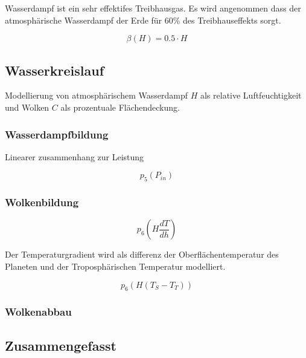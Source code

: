 \begin{refsection}
Wasserdampf ist ein sehr effektifes Treibhausgas. Es wird angenommen dass der atmosphärische Wasserdampf der Erde für 60\% des Treibhauseffekts sorgt.  




\begin{equation}
\beta(H) = 0.5 \cdot H
\end{equation}


\subsection{Wasserkreislauf}

Modellierung von atmosphärischem Wasserdampf $H$ als relative Luftfeuchtigkeit und Wolken $C$ als prozentuale Flächendeckung.


\subsubsection{Wasserdampfbildung}

Linearer zusammenhang zur Leistung

\begin{equation}
p_5 (P_{in})
\end{equation}

\subsubsection{Wolkenbildung}

\begin{equation}
p_6 \left( H \frac{dT}{dh} \right)
\end{equation}

Der Temperaturgradient wird als differenz der Oberflächentemperatur des Planeten und der Troposphärischen Temperatur modelliert. 

\begin{equation}
p_6 \left( H(T_S - T_T) \right)
\end{equation}

\subsubsection{Wolkenabbau}


\subsection{Zusammengefasst}



\end{refsection}
